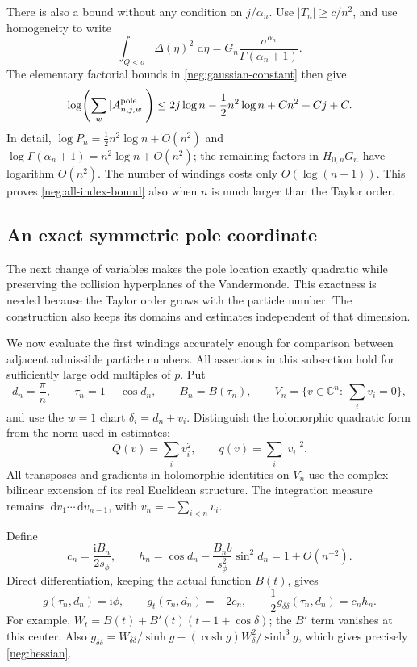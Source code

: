 \documentclass[11pt]{article}
\numberwithin{equation}{section}
\theoremstyle{definition}
\newcommand{\C}{\mathbb C}
\newcommand{\ii}{\mathrm i}
\newcommand{\dd}{\,\mathrm d}
\begin{document}
There is also a bound without any condition on \(j/\alpha_n\).
Use \(|T_n|\ge c/n^2\), and use homogeneity to write
\[
 \int_{Q<\sigma}\Delta(\eta)^2\,\dd\eta
       =G_n\frac{\sigma^{\alpha_n}}{\Gamma(\alpha_n+1)}.
 \]
The elementary factorial bounds in \eqref{neg:gaussian-constant}
then give
\begin{equation}
 \log\!\left(\sum_w|A^{\rm pole}_{n,j,w}|\right)
 \le 2j\log n-\frac12n^2\log n+Cn^2+Cj+C .
 \label{neg:all-index-bound}
\end{equation}
In detail,
\(\log P_n=\tfrac12n^2\log n+O(n^2)\) and
\(\log\Gamma(\alpha_n+1)=n^2\log n+O(n^2)\);
the remaining factors in \(H_{0,n}G_n\) have logarithm \(O(n^2)\).
The number of windings costs only \(O(\log(n+1))\).
This proves \eqref{neg:all-index-bound} also when \(n\) is much
larger than the Taylor order.

\subsection{An exact symmetric pole coordinate}
\label{neg:normal-form}

The next change of variables makes the pole location exactly
quadratic while preserving the collision hyperplanes of the
Vandermonde. This exactness is needed because the Taylor order grows
with the particle number. The construction also keeps its domains
and estimates independent of that dimension.

We now evaluate the first windings accurately enough for comparison
between adjacent admissible particle numbers.  All assertions in
this subsection hold for sufficiently large odd multiples of \(p\).
Put
\begin{equation}
 d_n=\frac\pi n,\qquad
 \tau_n=1-\cos d_n,\qquad B_n=B(\tau_n),\qquad
 V_n=\{v\in\C^n:\ \sum_i v_i=0\},
 \label{neg:center}
\end{equation}
and use the \(w=1\) chart \(\delta_i=d_n+v_i\).  Distinguish the
holomorphic quadratic form from the norm used in estimates:
\[
 Q(v)=\sum_i v_i^2,\qquad q(v)=\sum_i|v_i|^2 .
 \]
All transposes and gradients in holomorphic identities on \(V_n\)
use the complex bilinear extension of its real Euclidean structure.
The integration measure remains
\(\dd v_1\cdots\dd v_{n-1}\), with \(v_n=-\sum_{i<n}v_i\).

Define
\begin{equation}
 c_n=\frac{\ii B_n}{2s_\phi},\qquad
 h_n=\cos d_n-\frac{B_n b}{s_\phi^2}\sin^2d_n
       =1+O(n^{-2}).
 \label{neg:hessian}
\end{equation}
Direct differentiation, keeping the actual function \(B(t)\), gives
\begin{equation}
 g(\tau_n,d_n)=\ii\phi,\qquad
 g_t(\tau_n,d_n)=-2c_n,\qquad
 \frac12g_{\delta\delta}(\tau_n,d_n)=c_n h_n .
 \label{neg:center-derivatives}
\end{equation}
For example, \(W_t=B(t)+B'(t)(t-1+\cos\delta)\); the
\(B'\) term vanishes at this center.  Also
\(g_{\delta\delta}=W_{\delta\delta}/\sinh g
-(\cosh g)W_\delta^2/\sinh^3g\), which gives precisely
\eqref{neg:hessian}.
\end{document}
